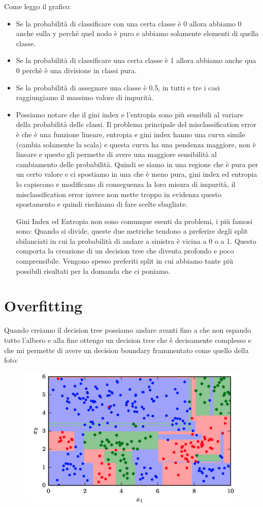 \documentclass[14pt]{extreport}
\begin{document}
Come leggo il grafico:
\begin{itemize}
	\item Se la probabilità di classificare con una certa classe è 0 allora abbiamo 0 anche sulla y perchè quel nodo è puro e abbiamo solamente
	elementi di quella classe.
	\item Se la probabilità di classificare una certa classe è 1 allora abbiamo anche qua 0 perchè è una divisione in classi pura.
	\item Se la probabilità di assegnare una classe è 0.5, in tutti e tre i casi raggiungiamo il massimo valore di impurità.
	\item Possiamo notare che il gini index e l’entropia sono più sensibili al variare della probabilità delle classi. Il problema principale del
	      misclassification error è che è una funzione lineare, entropia e gini index hanno una curva simile (cambia solamente la scala) e questa
	      curva ha una pendenza maggiore, non è lineare e questo gli permette di avere una maggiore sensibilità al cambiamento delle probabilità.
	      Quindi se siamo in una regione che è pura per un certo valore e ci spostiamo in una che è meno pura, gini index ed entropia lo capiscono e
	      modificano di conseguenza la loro misura di impurità, il misclassification error invece non mette troppo in evidenza questo spostamento e
	      quindi rischiamo di fare scelte sbagliate.

	      Gini Index ed Entropia non sono comunque esenti da problemi, i più famosi sono: Quando si divide, queste due metriche tendono a preferire
	      degli split sbilanciati in cui la probabilità di andare a sinistra è vicina a 0 o a 1. Questo comporta la creazione di un decision tree che
	      diventa profondo e poco comprensibile. Vengono spesso preferiti split in cui abbiamo tante più possibili risultati per la domanda che ci
	      poniamo.

\end{itemize}

\section{Overfitting}

Quando creiamo il decision tree possiamo andare avanti fino a che non espando tutto l’albero e alla fine ottengo un decision tree che è decisamente
complesso e che mi permette di avere un decision boundary frammentato come quello della foto:


\begin{figure}[H]
	\centering
	\includegraphics[width=0.7\linewidth]{591.jpeg}
\end{figure}
\end{document}
